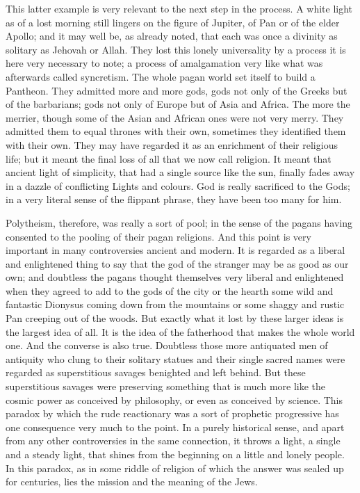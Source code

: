This latter example is very relevant to the next step in the process. A white light as of a lost morning still lingers on the figure of Jupiter, of Pan or of the elder Apollo; and it may well be, as already noted, that each was once a divinity as solitary as Jehovah or Allah. They lost this lonely universality by a process it is here very necessary to note; a process of amalgamation very like what was afterwards called syncretism. The whole pagan world set itself to build a Pantheon. They admitted more and more gods, gods not only of the Greeks but of the barbarians; gods not only of Europe but of Asia and Africa. The more the merrier, though some of the Asian and African ones were not very merry. They admitted them to equal thrones with their own, sometimes they identified them with their own. They may have regarded it as an enrichment of their religious life; but it meant the final loss of all that we now call religion. It meant that ancient light of simplicity, that had a single source like the sun, finally fades away in a dazzle of conflicting Lights and colours. God is really sacrificed to the Gods; in a very literal sense of the flippant phrase, they have been too many for him.

Polytheism, therefore, was really a sort of pool; in the sense of the pagans having consented to the pooling of their pagan religions. And this point is very important in many controversies ancient and modern. It is regarded as a liberal and enlightened thing to say that the god of the stranger may be as good as our own; and doubtless the pagans thought themselves very liberal and enlightened when they agreed to add to the gods of the city or the hearth some wild and fantastic Dionysus coming down from the mountains or some shaggy and rustic Pan creeping out of the woods. But exactly what it lost by these larger ideas is the largest idea of all. It is the idea of the fatherhood that makes the whole world one. And the converse is also true. Doubtless those more antiquated men of antiquity who clung to their solitary statues and their single sacred names were regarded as superstitious savages benighted and left behind. But these superstitious savages were preserving something that is much more like the cosmic power as conceived by philosophy, or even as conceived by science. This paradox by which the rude reactionary was a sort of prophetic progressive has one consequence very much to the point. In a purely historical sense, and apart from any other controversies in the same connection, it throws a light, a single and a steady light, that shines from the beginning on a little and lonely people. In this paradox, as in some riddle of religion of which the answer was sealed up for centuries, lies the mission and the meaning of the Jews.

